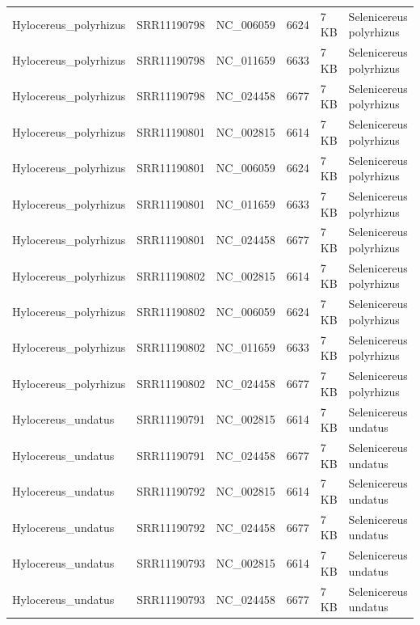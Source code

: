 \documentclass[fleqn,10pt,lineno]{wlpeerj}
\begin{document}
\begin{table}[ht]
{\begin{tabular}{@{}llllll@{}}
Hylocereus\_polyrhizus & SRR11190798  & NC\_006059              & 6624            & 7 KB & Selenicereus polyrhizus \\
Hylocereus\_polyrhizus & SRR11190798  & NC\_011659              & 6633            & 7 KB & Selenicereus polyrhizus \\
Hylocereus\_polyrhizus & SRR11190798  & NC\_024458              & 6677            & 7 KB & Selenicereus polyrhizus \\
Hylocereus\_polyrhizus & SRR11190801  & NC\_002815              & 6614            & 7 KB & Selenicereus polyrhizus \\
Hylocereus\_polyrhizus & SRR11190801  & NC\_006059              & 6624            & 7 KB & Selenicereus polyrhizus \\
Hylocereus\_polyrhizus & SRR11190801  & NC\_011659              & 6633            & 7 KB & Selenicereus polyrhizus \\
Hylocereus\_polyrhizus & SRR11190801  & NC\_024458              & 6677            & 7 KB & Selenicereus polyrhizus \\
Hylocereus\_polyrhizus & SRR11190802  & NC\_002815              & 6614            & 7 KB & Selenicereus polyrhizus \\
Hylocereus\_polyrhizus & SRR11190802  & NC\_006059              & 6624            & 7 KB & Selenicereus polyrhizus \\
Hylocereus\_polyrhizus & SRR11190802  & NC\_011659              & 6633            & 7 KB & Selenicereus polyrhizus \\
Hylocereus\_polyrhizus & SRR11190802  & NC\_024458              & 6677            & 7 KB & Selenicereus polyrhizus \\
Hylocereus\_undatus    & SRR11190791  & NC\_002815              & 6614            & 7 KB & Selenicereus undatus    \\
Hylocereus\_undatus    & SRR11190791  & NC\_024458              & 6677            & 7 KB & Selenicereus undatus    \\
Hylocereus\_undatus    & SRR11190792  & NC\_002815              & 6614            & 7 KB & Selenicereus undatus    \\
Hylocereus\_undatus    & SRR11190792  & NC\_024458              & 6677            & 7 KB & Selenicereus undatus    \\
Hylocereus\_undatus    & SRR11190793  & NC\_002815              & 6614            & 7 KB & Selenicereus undatus    \\
Hylocereus\_undatus    & SRR11190793  & NC\_024458              & 6677            & 7 KB & Selenicereus undatus    \\

\end{tabular}}
\end{table}
\end{document}
